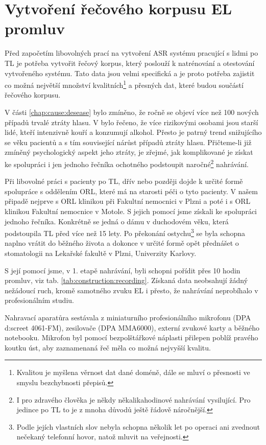 \section{Vytvoření řečového korpusu EL promluv}
\label{chap:construction:corpus}

Před započetím libovolných prací na vytvoření ASR systému pracující s lidmi po TL je potřeba vytvořit řečový korpus, který poslouží k natrénování a otestování vytvořeného systému. Tato data jsou velmi specifická a je proto potřeba zajistit co možná největší množství kvalitních\footnote{Kvalitou je myšlena věrnost dat dané doméně, dále se mluví o přesnosti ve smyslu bezchybnosti přepisů.} a přesných dat, které budou součástí řečového korpusu.

V části \ref{chap:cause:desease} bylo zmíněno, že ročně se objeví více než 100 nových případů trvalé ztráty hlasu. V \cite{Skvrnakova2010} bylo řečeno, že více rizikovými osobami jsou starší lidé, kteří intenzivně kouří a konzumují alkohol. Přesto je patrný trend snižujícího se věku pacientů a s tím související nárůst případů ztráty hlasu. Přičteme-li již zmíněný psychologický aspekt jeho ztráty, je zřejmé, jak komplikované je získat ke spolupráci i jen jednoho řečníka ochotného podstoupit naročné\footnote{I pro zdravého člověka je někdy někalikahodinové nahrávání vysilující. Pro jedince po TL to je z mnoha důvodů ještě řádově náročnější.} nahrávání.

Při libovolné práci s pacienty po TL, dřív nebo později dojde k určité formě spolupráce s oddělením ORL, které má na starosti péči o tyto pacienty. V našem připadě nejprve s ORL klinikou při Fakultní nemocnici v Plzni a poté i s ORL klinikou Fakultní nemocnice v Motole. S jejich pomocí jsme získali ke spolupráci jednoho řečníka. Konkrétně se jedná o dámu v duchodovém věku, která podstoupila TL před více než 15 lety. Po překonání ostychu\footnote{Podle jejích vlastních slov nebyla schopna několik let po operaci ani zvednout nečekaný telefonní hovor, natož mluvit na veřejnosti.} se byla schopna naplno vrátit do běžného života a dokonce v určité formě opět přednášet o stomatologii na Lekařské fakultě v Plzni, Univerzity Karlovy.

S její pomocí jsme, v 1. etapě nahrávání, byli schopni pořídit přes 10 hodin promluv, viz tab. \ref{tab:construction:recording}. Získaná data neobsahují žádný nežádoucí ruch, kromě samotného zvuku EL i přesto, že nahrávání neprobíhalo v profesionálním studiu.

Nahravací aparatůra sestávala z miniaturního profesionálního mikrofonu (DPA d:screet 4061-FM), zesilovače (DPA MMA6000), externí zvukové karty a běžného notebooku. Mikrofon byl pomocí bezpolštářkové náplasti přilepen poblíž pravého koutku úst, aby zaznamenaná řeč měla co možná nejvyšší kvalitu.

